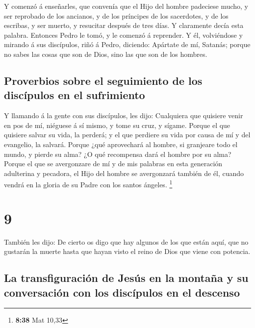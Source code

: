  Y comenzó á enseñarles, que convenía que el Hijo del
hombre padeciese mucho, y ser reprobado de los ancianos, y de los
príncipes de los sacerdotes, y de los escribas, y ser muerto, y
resucitar después de tres días.  Y claramente decía esta
palabra. Entonces Pedro le tomó, y le comenzó á reprender. 
Y él, volviéndose y mirando á sus discípulos, riñó á Pedro, diciendo:
Apártate de mí, Satanás; porque no sabes las cosas que son de Dios, sino
las que son de los hombres.

\hypertarget{proverbios-sobre-el-seguimiento-de-los-discuxedpulos-en-el-sufrimiento}{%
\subsection{Proverbios sobre el seguimiento de los discípulos en el
sufrimiento}\label{proverbios-sobre-el-seguimiento-de-los-discuxedpulos-en-el-sufrimiento}}

 Y llamando á la gente con sus discípulos, les dijo:
Cualquiera que quisiere venir en pos de mí, niéguese á sí mismo, y tome
su cruz, y sígame.  Porque el que quisiere salvar su vida,
la perderá; y el que perdiere su vida por causa de mí y del evangelio,
la salvará.  Porque ¿qué aprovechará al hombre, si
granjeare todo el mundo, y pierde su alma?  ¿O qué
recompensa dará el hombre por su alma?  Porque el que se
avergonzare de mí y de mis palabras en esta generación adulterina y
pecadora, el Hijo del hombre se avergonzará también de él, cuando vendrá
en la gloria de su Padre con los santos ángeles. \footnote{\textbf{8:38}
  Mat 10,33}

\hypertarget{section-8}{%
\section{9}\label{section-8}}

 También les dijo: De cierto os digo que hay algunos de los
que están aquí, que no gustarán la muerte hasta que hayan visto el reino
de Dios que viene con potencia.

\hypertarget{la-transfiguraciuxf3n-de-jesuxfas-en-la-montauxf1a-y-su-conversaciuxf3n-con-los-discuxedpulos-en-el-descenso}{%
\subsection{La transfiguración de Jesús en la montaña y su conversación
con los discípulos en el
descenso}\label{la-transfiguraciuxf3n-de-jesuxfas-en-la-montauxf1a-y-su-conversaciuxf3n-con-los-discuxedpulos-en-el-descenso}}

